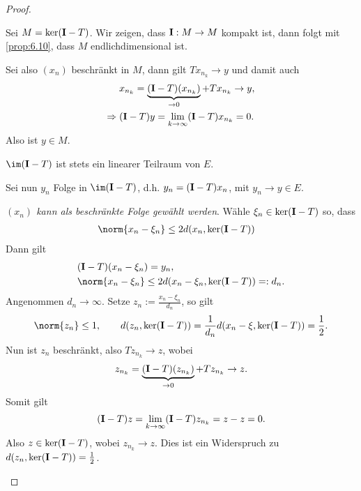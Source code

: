 \begin{proof}
\begin{proofenum}
  \item Sei $M=\ker(\mathbf{I}-T)$. Wir zeigen, dass $\mathbf{I}:M\to M$ kompakt
  ist, dann folgt mit \ref{prop:6.10}, dass $M$ endlichdimensional ist.
  
  Sei also $(x_n)$ beschränkt in $M$, dann gilt $Tx_{n_k}\to y$ und damit auch
\begin{align*}
&x_{n_k} = \underbrace{(\mathbf{I}-T)(x_{n_k})}_{\to 0} + Tx_{n_k} \to y,\\
\Rightarrow\;& (\mathbf{I}- T)y = \lim\limits_{k\to\infty} (\mathbf{I} -T)x_{n_k} = 0.
\end{align*}
Also ist $y\in M$.
\item $\im (\Id-T)$ ist stets ein linearer Teilraum von $E$.

Sei nun $y_n$ Folge in $\im(\Id-T)$, d.h. $y_n=(\mathbf{I}-T)x_n$, mit $y_n\to y\in E$.
\begin{proofenuma}
  \item\textit{$(x_n)$ kann als beschränkte Folge gewählt werden}. Wähle
  $\xi_n \in \ker (\mathbf{I}-T)$ so, dass
\begin{align*}
&\norm{x_n-\xi_n} \le 2d(x_n,\ker(\Id-T))
\end{align*}
Dann gilt
\begin{align*}
&(\Id-T)(x_n-\xi_n) = y_n,\\
&\norm{x_n-\xi_n} \le 2d(x_n-\xi_n,\ker(\Id-T)) =: d_n.
\end{align*}
Angenommen $d_n\to \infty$. Setze $z_n := \frac{x_n-\xi_n}{d_n}$, so gilt
\begin{align*}
\norm{z_n} \le 1,\qquad d(z_n,\ker(\Id-T)) = \frac{1}{d_n}d(x_n-\xi,\ker(\Id-T))
= \frac{1}{2}.
\end{align*}
Nun ist $z_n$ beschränkt, also $Tz_{n_k}\to z$, wobei
\begin{align*}
z_{n_k} = \underbrace{(\mathbf{I}-T)(z_{n_k})}_{\to 0} + Tz_{n_k} \to z.
\end{align*}
Somit gilt
\begin{align*}
(\mathbf{I}-T)z = \lim\limits_{k\to\infty} (\mathbf{I}-T)z_{n_k} = z-z=0.
\end{align*}
Also $z\in\ker (\mathbf{I}-T)$, wobei $z_{n_k}\to z$. Dies ist ein Widerspruch zu
$d(z_n,\ker(\mathbf{I}-T))=\frac{1}{2}$.


\end{proofenuma}
\end{proofenum}
\end{proof}

